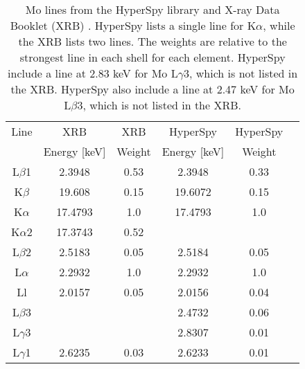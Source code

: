 
\begin{table}[tbp]
    \centering
    \caption{
        Mo lines from the HyperSpy library \cite{hyperspy_1.7.1} and X-ray Data Booklet (XRB) \cite[Table 1.2 and 1.3]{thompson_x-ray_2004}.
        HyperSpy lists a single line for K$\alpha$, while the XRB lists two lines.
        The weights are relative to the strongest line in each shell for each element.
        HyperSpy include a line at 2.83 keV for Mo L$\gamma$3, which is not listed in the XRB.
        HyperSpy also include a line at 2.47 keV for Mo L$\beta$3, which is not listed in the XRB.
    }
    \label{tab:theory:Mo-lines}
    \begin{tabular}{cccccc}
        Line       & XRB          & XRB    & HyperSpy     & HyperSpy \\
                   & Energy [keV] & Weight & Energy [keV] & Weight   \\
        \hline
        L$\beta$1  & 2.3948       & 0.53   & 2.3948       & 0.33     \\
        K$\beta$   & 19.608       & 0.15   & 19.6072      & 0.15     \\
        K$\alpha$  & 17.4793      & 1.0    & 17.4793      & 1.0      \\
        K$\alpha$2 & 17.3743      & 0.52   &              &          \\
        L$\beta$2  & 2.5183       & 0.05   & 2.5184       & 0.05     \\
        L$\alpha$  & 2.2932       & 1.0    & 2.2932       & 1.0      \\
        Ll         & 2.0157       & 0.05   & 2.0156       & 0.04     \\
        L$\beta$3  &              &        & 2.4732       & 0.06     \\
        L$\gamma$3 &              &        & 2.8307       & 0.01     \\
        L$\gamma$1 & 2.6235       & 0.03   & 2.6233       & 0.01
    \end{tabular}
\end{table}
